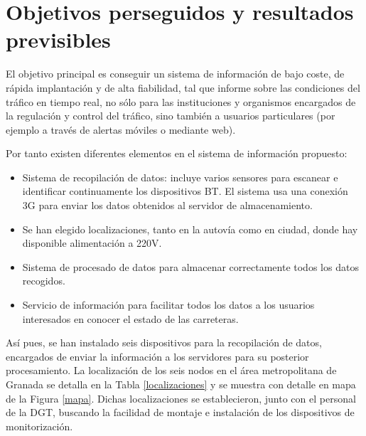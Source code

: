 \documentclass[twocolumn,twoside]{Jornadas}
\begin{document}
\section{Objetivos perseguidos y resultados previsibles}
\label{obj}

El objetivo principal es conseguir un sistema de información de bajo coste, de rápida implantación y de alta fiabilidad, tal que informe sobre las 
condiciones del tráfico en tiempo real, no sólo para las instituciones y organismos encargados de la regulación y control del tráfico, 
sino también a usuarios particulares (por ejemplo a través de alertas móviles o mediante web). 

Por tanto existen diferentes elementos en el sistema de información propuesto:

\begin{itemize}

  \item Sistema de recopilación de datos: incluye varios sensores para escanear e identificar continuamente los dispositivos BT. El sistema usa una conexión 3G para enviar los datos obtenidos al servidor de almacenamiento.
  
  \item Se han elegido localizaciones, tanto en la autovía como en ciudad, donde hay disponible alimentación a 220V.

  \item Sistema de procesado de datos para almacenar correctamente todos los datos recogidos.

  \item Servicio de información para facilitar todos los datos a los usuarios interesados en conocer el estado de las carreteras.

\end{itemize}

Así pues, se han instalado seis dispositivos para la recopilación de datos, encargados de enviar la información a los servidores para su posterior procesamiento. 
La localización de los seis nodos en el área metropolitana de Granada se detalla en la Tabla \ref{localizaciones} y se muestra con detalle en mapa de la Figura \ref{mapa}.
Dichas localizaciones se establecieron, junto con el personal de la DGT, buscando la facilidad de montaje e instalación de los dispositivos de monitorización.
\end{document}
